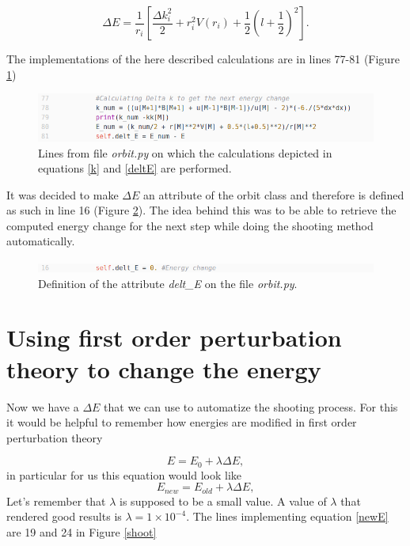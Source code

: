 \documentclass[12pt]{article}
\begin{document}
\begin{equation}
    \Delta E = \frac{1}{r_i}\left[\frac{\Delta k_i^2}{2} + r_i^2V(r_i) + \frac{1}{2}\left(l + \frac{1}{2}\right)^2\right].
    \label{deltE}
\end{equation}

The implementations of the here described calculations are in lines 77-81 (Figure \ref{deltk})

\begin{figure}[h!]
    \centering
    \includegraphics[width=\linewidth]{deltk}
    \caption{Lines from file \textit{orbit.py} on which the calculations depicted in equations \ref{k} and \ref{deltE} are performed.}
    \label{deltk}
\end{figure}
It was decided to make $\Delta E$ an attribute of the orbit class and therefore is defined as such in line 16 (Figure \ref{fig:delte}). The idea behind this was to be able to retrieve the computed energy change for the next step while doing the shooting method automatically.

\begin{figure}[h!]
    \centering
    \includegraphics[width=\linewidth]{delte}
    \caption{Definition of the attribute \textit{delt\_E} on the file \textit{orbit.py}.}
    \label{fig:delte}
\end{figure}


\section{Using first order perturbation theory to change the energy}

Now we have a $\Delta E$ that we can use to automatize the shooting process. For this it would be helpful to remember how energies are modified in first order perturbation theory

\begin{equation*}
    E = E_0 + \lambda \Delta E,
\end{equation*}
in particular for us this equation would look like
\begin{equation}
    E_{new} = E_{old} + \lambda \Delta E,
    \label{newE}
\end{equation}
Let's remember that $\lambda$ is supposed to be a small value. A value of $\lambda$ that rendered good results is $\lambda = 1\times 10^{-4}$. The lines implementing equation \ref{newE} are 19 and 24 in Figure \ref{shoot}
\end{document}
